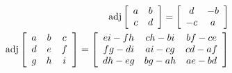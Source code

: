 \begin{align*}
    \text{adj}\left[
        \begin{array}{c c}
            a & b\\
            c & d            
        \end{array}
    \right]
    = \left[
        \begin{array}{c c}
            d & -b\\
            -c & a
        \end{array}
    \right]
    \\
    \text{adj}\left[
        \begin{array}{c c c}
            a & b & c\\
            d & e & f\\
            g & h & i
        \end{array}
    \right]
    = \left[
        \begin{array}{c c c}
            ei-fh & ch-bi & bf-ce\\
            fg-di & ai-cg & cd-af\\
            dh-eg & bg-ah & ae-bd            
        \end{array}
    \right]
\end{align*}